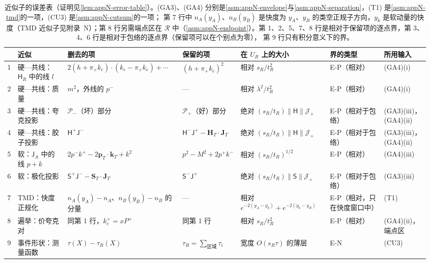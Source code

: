 \begin{table}[htbp]
\centering
\footnotesize
\renewcommand{\arraystretch}{1.12}
\setlength{\tabcolsep}{3.5pt}
\begin{tabularx}{\textwidth}{@{}c>{\raggedright\arraybackslash}p{2.3cm}>{\raggedright\arraybackslash}X>{\raggedright\arraybackslash}p{2.6cm}>{\raggedright\arraybackslash}p{2.75cm}>{\raggedright\arraybackslash}p{1.7cm}>{\raggedright\arraybackslash}p{1.6cm}@{}}
\toprule
& 近似 & 删去的项 & 保留的项 & 在 $U_R$ 上的大小 & 界的类型 & 所用输入\\
\midrule
1 & 硬—共线：$\mathsf H_R$ 中的线 $l$ & $2(h+\pi_+k_e)\cdot(k_e-\pi_+k_e)+\cdots$ & $(h+\pi_+k_e)^2$ & 相对 $s_R/t_R^2$ & E-P（相对） & (GA4)(i)\\
2 & 硬—共线：质量 & $m^2$，外线的 $p^-$ & — & 相对 $\lambda^2/t_R^2$ & E-P（相对） & (GA4)(i)\\
3 & 硬—共线：夸克投影 & $\mathcal P_-$（坏）部分 & $\mathcal P_+$（好）部分 & 绝对 $(s_R/t_R)\|\mathsf H\|\mathcal J_+$ & E-P（相对于包络） & (GA3)(iii)，(GA4)(ii)\\
4 & 硬—共线：胶子投影 & $\mathsf H^+\mathsf J^-$ & $\mathsf H^-\mathsf J^+-\mathbf H_T\cdot\mathbf J_T$ & 绝对 $(s_R/t_R)\|\mathsf H\|\mathcal J_+$ & E-P（相对于包络） & (GA3)(iii)，(GA4)(ii)\\
5 & 软：$\mathsf J_A$ 中的线 $p+k$ & $2p^-k^+-2\mathbf p_T\cdot\mathbf k_T+k^2$ & $p^2-M^2+2p^+k^-$ & 相对 $(s_R/t_R)^{1/2}$ & E-P（相对） & (GA4)(iii)\\
6 & 软：极化投影 & $\mathsf S^+\mathsf J^--\mathbf S_T\cdot\mathbf J_T$ & $\mathsf S^-\mathsf J^+$ & 绝对 $(s_R/t_R)\|\mathsf S\|\mathcal J_+$ & E-P（相对于包络） & (GA3)(iii)\\
7 & TMD：快度正规化 & $n_A(y_A)-n_A$、$n_B(y_B)-n_B$ 的分量 & — & 相对 $e^{-2(y_A-y_k)}+e^{-2(y_k-y_B)}$ & E-P（相对，只在快度窗口中） & (T1)\\
8 & 遍举：价夸克对 & 同第 1 行，$k_e^+=xP^+$ & 同第 1 行 & 相对 $s_R/t_R^2$ & E-P（相对） & (GA4)(ii)，端点区\\
9 & 事件形状：测量函数 & $\tau(X)-\tau_R(X)$ & $\tau_R=\sum_{\text{区域}}\tau_i$ & 宽度 $O(s_R\tau)$ 的薄层 & E-N & (CU3)\\
\bottomrule
\end{tabularx}
\caption{近似子的误差表（证明见\cref{lem:appN-error-table}）。(GA3)、(GA4) 分别是\cref{asm:appN-envelope}与\cref{asm:appN-separation}，(T1) 是\cref{asm:appN-tmd}的一项，(CU3) 是\cref{asm:appN-cutsum}的一项；
第 7 行中 $n_A(y_A)$、$n_B(y_B)$ 是快度为 $y_A$、$y_B$ 的类空正规子方向，$y_k$ 是软动量的快度（TMD 近似子见附录~N）；第 8 行另需端点区在 $\mathcal R$ 中（\cref{asm:appN-endpoint}）。第 1、2、5、7、8 行是相对于保留项的逐点界，第 3、4、6 行是相对于包络的逐点界（保留项可以在个别点为零），
第 9 行只有积分意义下的界。}
\label{tab:method-errors}
\end{table}

